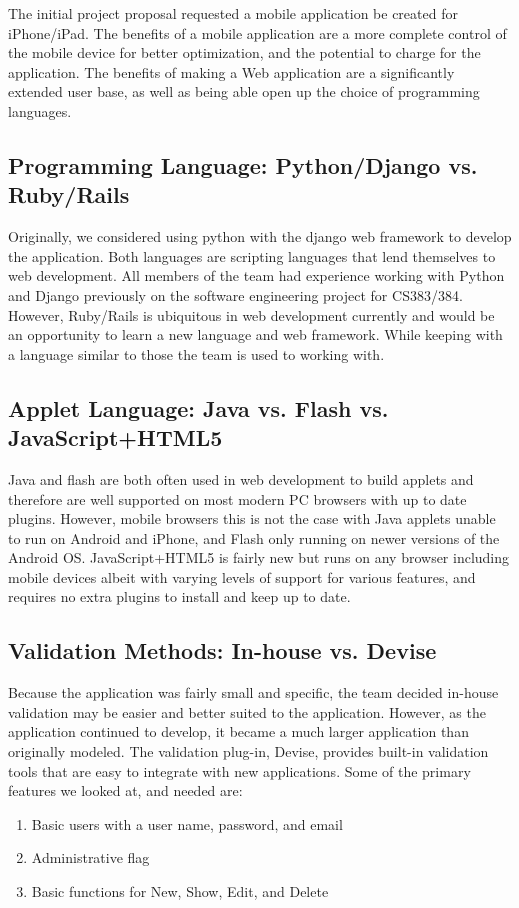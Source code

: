 \documentclass[12pt,english]{article}
\begin{document}
The initial project proposal requested a mobile application be created
for iPhone/iPad.  The benefits of a mobile application are a more
complete control of the mobile device for better optimization, and
the potential to charge for the application.  The benefits of making
a Web application are a significantly extended user base, as well
as being able open up the choice of programming languages.


\subsection{Programming Language: Python/Django vs. Ruby/Rails}

Originally, we considered using python with the django web framework
to develop the application. Both languages are scripting languages
that lend themselves to web development. All members of the team had
experience working with Python and Django previously on the software
engineering project for CS383/384. However, Ruby/Rails is ubiquitous
in web development currently and would be an opportunity to learn
a new language and web framework. While keeping with a language
similar to those the team is used to working with.


\subsection{Applet Language: Java vs. Flash vs. JavaScript+HTML5 }

Java and flash are both often used in web development to build applets
and therefore are well supported on most modern PC browsers with up
to date plugins. However, mobile browsers this is not the case with
Java applets unable to run on Android and iPhone, and Flash only running
on newer versions of the Android OS. JavaScript+HTML5 is fairly new
but runs on any browser including mobile devices albeit with varying
levels of support for various features, and requires no extra plugins
to install and keep up to date.


\subsection{Validation Methods: In-house vs. Devise}

Because the application was fairly small and specific, the team decided
in-house validation may be easier and better suited to the application.
However, as the application continued to develop, it became a much
larger application than originally modeled. The validation plug-in,
Devise, provides built-in validation tools that are easy to integrate
with new applications. Some of the primary features we looked at, and
needed are: 
\begin{enumerate}
\item Basic users with a user name, password, and email
\item Administrative flag
\item Basic functions for New, Show, Edit, and Delete
\end{enumerate}
\end{document}
